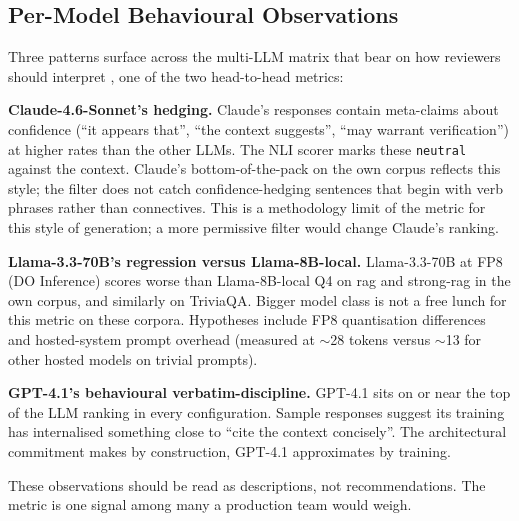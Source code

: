 \subsection{Per-Model Behavioural Observations}
\label{sec:per-model}

Three patterns surface across the multi-LLM matrix that bear on
how reviewers should interpret \unsupf{}, one of the two
head-to-head metrics:

\textbf{Claude-4.6-Sonnet's hedging.} Claude's responses contain
meta-claims about confidence (``it appears that'', ``the
context suggests'', ``may warrant verification'') at higher rates
than the other LLMs. The NLI scorer marks these \texttt{neutral}
against the context. Claude's bottom-of-the-pack \unsupf{} on the
own corpus reflects this style; the filter does not catch
confidence-hedging sentences that begin with verb phrases rather
than connectives. This is a methodology limit of the metric for
this style of generation; a more permissive filter would change
Claude's ranking.

\textbf{Llama-3.3-70B's regression versus Llama-8B-local.}
Llama-3.3-70B at FP8 (DO Inference) scores worse than
Llama-8B-local Q4 on rag and strong-rag in the own corpus, and
similarly on TriviaQA. Bigger model class is not a free lunch
for this metric on these corpora. Hypotheses include FP8
quantisation differences and hosted-system prompt overhead
(measured at $\sim$28 tokens versus $\sim$13 for other hosted
models on trivial prompts).

\textbf{GPT-4.1's behavioural verbatim-discipline.} GPT-4.1 sits
on or near the top of the LLM ranking in every configuration.
Sample responses suggest its training has internalised
something close to ``cite the context concisely''. The
architectural commitment \hyphae{} makes by construction,
GPT-4.1 approximates by training.

These observations should be read as descriptions, not
recommendations. The metric is one signal among many a
production team would weigh.
